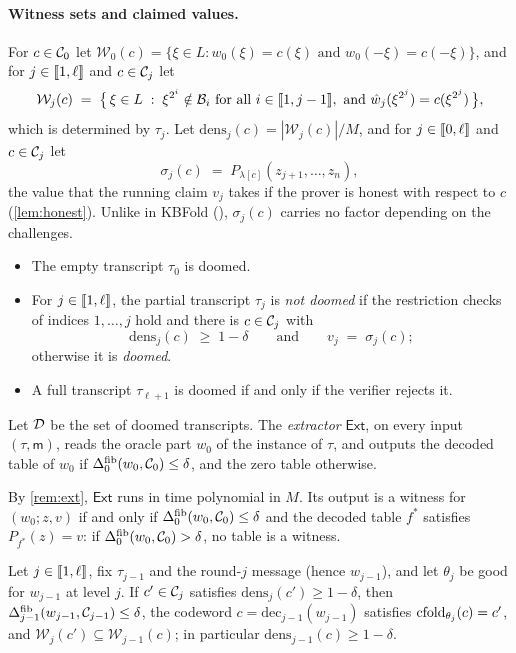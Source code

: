 \paragraph{Witness sets and claimed values.}
For $c \in \mathcal{C}_0$ let $\mathcal{W}_0(c) = \{\xi \in L : w_0(\xi) = c(\xi) \text{ and } w_0(-\xi) = c(-\xi)\}$, and for $j \in \llbracket 1, \ell \rrbracket$ and $c \in \mathcal{C}_j$ let
\[
  \mathcal{W}_j(c) \;=\; \bigl\{\, \xi \in L \;:\; \xi^{2^i} \notin \mathcal{B}_i \text{ for all } i \in \llbracket 1, j-1 \rrbracket, \text{ and } \hat w_j(\xi^{2^j}) = c(\xi^{2^j}) \,\bigr\},
\]
which is determined by $\tau_j$. Let $\mathrm{dens}_j(c) = |\mathcal{W}_j(c)|/M$, and for $j \in \llbracket 0, \ell \rrbracket$ and $c \in \mathcal{C}_j$ let
\[
  \sigma_j(c) \;=\; P_{\lambda[c]}(z_{j+1}, \dots, z_{n}),
\]
the value that the running claim $v_j$ takes if the prover is honest with respect to $c$ (\cref{lem:honest}).
Unlike in KBFold (), $\sigma_j(c)$ carries no factor depending on the challenges.

\begin{definition}\label{def:state}
\begin{itemize}
  \item The empty transcript $\tau_0$ is doomed.
  \item For $j \in \llbracket 1, \ell \rrbracket$, the partial transcript $\tau_j$ is \emph{not doomed} if the restriction checks of indices $1,\dots,j$ hold and there is $c \in \mathcal{C}_j$ with
  \[
    \mathrm{dens}_j(c) \;\ge\; 1 - \delta
    \qquad\text{and}\qquad
    v_j \;=\; \sigma_j(c);
  \]
  otherwise it is \emph{doomed}.
  \item A full transcript $\tau_{\ell+1}$ is doomed if and only if the verifier rejects it.
\end{itemize}
Let $\mathcal{D}$ be the set of doomed transcripts.
The \emph{extractor} $\mathsf{Ext}$, on every input $(\tau, \mathsf{m})$, reads the oracle part $w_0$ of the instance of $\tau$, and outputs the decoded table of $w_0$ if $\Delta^{\mathrm{fib}}_0(w_0,\mathcal{C}_0) \le \delta$, and the zero table otherwise.
\end{definition}

By \cref{rem:ext}, $\mathsf{Ext}$ runs in time polynomial in $M$.
Its output is a witness for $(w_0;z,v)$ if and only if $\Delta^{\mathrm{fib}}_0(w_0,\mathcal{C}_0) \le \delta$ and the decoded table $f^*$ satisfies $P_{f^*}(z) = v$: if $\Delta^{\mathrm{fib}}_0(w_0,\mathcal{C}_0) > \delta$, no table is a witness.

\begin{lemma}\label{lem:rbr-step}
Let $j \in \llbracket 1, \ell \rrbracket$, fix $\tau_{j-1}$ and the round-$j$ message (hence $w_{j-1}$), and let $\theta_j$ be good for $w_{j-1}$ at level $j$.
If $c' \in \mathcal{C}_j$ satisfies $\mathrm{dens}_{j}(c') \ge 1-\delta$, then $\Delta^{\mathrm{fib}}_{j-1}(w_{j-1}, \mathcal{C}_{j-1}) \le \delta$, the codeword $c = \mathrm{dec}_{j-1}(w_{j-1})$ satisfies $\mathrm{cfold}_{\theta_j}(c) = c'$, and $\mathcal{W}_{j}(c') \subseteq \mathcal{W}_{j-1}(c)$; in particular $\mathrm{dens}_{j-1}(c) \ge 1-\delta$.
\end{lemma}

